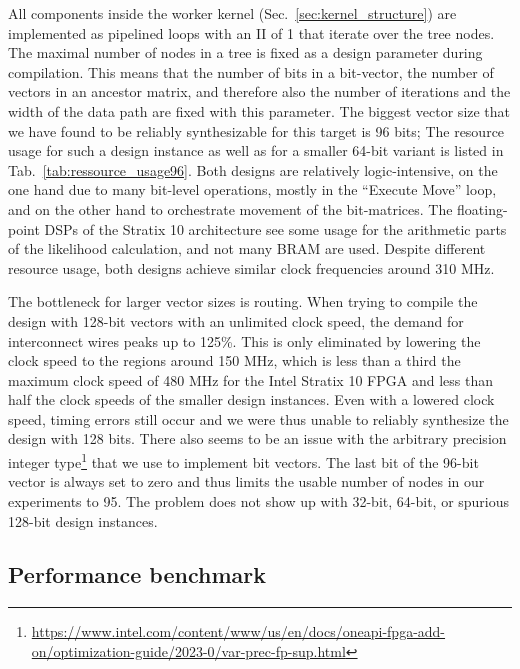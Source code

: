 All components inside the worker kernel (Sec.~\ref{sec:kernel_structure}) are implemented as pipelined loops with an \ac{II} of 1 that iterate over the tree nodes. The maximal number of nodes in a tree is fixed as a design parameter during compilation. This means that the number of bits in a bit-vector, the number of vectors in an ancestor matrix, and therefore also the number of iterations and the width of the data path are fixed with this parameter. The biggest vector size that we have found to be reliably synthesizable for this target is 96 bits; The resource usage for such a design instance as well as for a smaller 64-bit variant is listed in Tab.~\ref{tab:ressource_usage96}. Both designs are relatively logic-intensive, on the one hand due to many bit-level operations, mostly in the ``Execute Move'' loop, and on the other hand to orchestrate movement of the bit-matrices. The floating-point \acp{DSP} of the Stratix 10 architecture see some usage for the arithmetic parts of the likelihood calculation, and not many \acl{BRAM} are used. Despite different resource usage, both designs achieve similar clock frequencies around 310 MHz.

The bottleneck for larger vector sizes is routing. When trying to compile the design with 128-bit vectors with an unlimited clock speed, the demand for interconnect wires peaks up to 125\%. This is only eliminated by lowering the clock speed to the regions around 150 MHz, which is less than a third the maximum clock speed of 480 MHz for the Intel Stratix 10 \ac{FPGA} and less than half the clock speeds of the smaller design instances. Even with a lowered clock speed, timing errors still occur and we were thus unable to reliably synthesize the design with 128 bits. There also seems to be an issue with the arbitrary precision integer type\footnote{\url{https://www.intel.com/content/www/us/en/docs/oneapi-fpga-add-on/optimization-guide/2023-0/var-prec-fp-sup.html}} that we use to implement bit vectors. The last bit of the 96-bit vector is always set to zero and thus limits the usable number of nodes in our experiments to 95. The problem does not show up with 32-bit, 64-bit, or spurious 128-bit design instances.


\subsection{Performance benchmark}
\label{subsec:performance}

